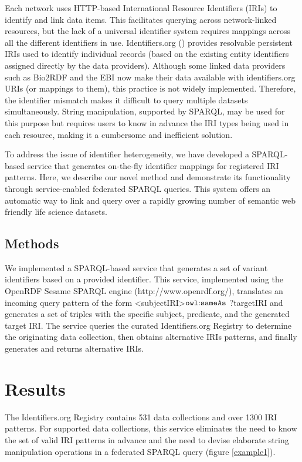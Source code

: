 \documentclass{bioinfo}
\begin{document}
Each network uses HTTP-based International Resource Identifiers (IRIs) to identify and link data items. This facilitates querying across network-linked resources, but the lack of a universal identifier system requires mappings across all the different identifiers in use. Identifiers.org (\cite{Juty01012012}) provides resolvable persistent IRIs used to identify individual records (based on the existing entity identifiers assigned directly by the data providers). Although some linked data providers such as Bio2RDF and the EBI now make their data available with identifiers.org URIs (or mappings to them), this practice is not widely implemented. Therefore, the identifier mismatch makes it difficult to query multiple datasets simultaneously.  String manipulation, supported by SPARQL, may be used for this purpose but requires users to know in advance the IRI types being used in each resource, making it a cumbersome and inefficient solution. 
 
To address the issue of identifier heterogeneity, we have developed a SPARQL-based service that generates on-the-fly identifier mappings for registered IRI patterns. Here, we describe our novel method and demonstrate its functionality through service-enabled federated SPARQL queries. This system offers an automatic way to link and query over a rapidly growing number of semantic web friendly life science datasets.

\begin{methods}
\section{Methods}
We implemented a SPARQL-based service that generates a set of variant identifiers based on a provided identifier. This service, implemented using the OpenRDF Sesame SPARQL engine (http://www.openrdf.org/), translates an incoming query pattern of the form \textless subjectIRI\textgreater $\mathtt{owl\text{\rm :}{}sameAs}$ ?targetIRI and generates a set of triples with the specific subject, predicate, and the generated target IRI. The service queries the curated Identifiers.org Registry to determine the originating data collection, then obtains alternative IRIs patterns, and finally generates and returns alternative IRIs.
\end{methods}

\section{Results}
The Identifiers.org Registry contains 531 data collections and over 1300 IRI patterns. For supported data collections, this service eliminates the need to know the set of valid IRI patterns in advance and the need to devise elaborate string manipulation operations in a federated SPARQL query (figure \ref{example1}).
\end{document}
